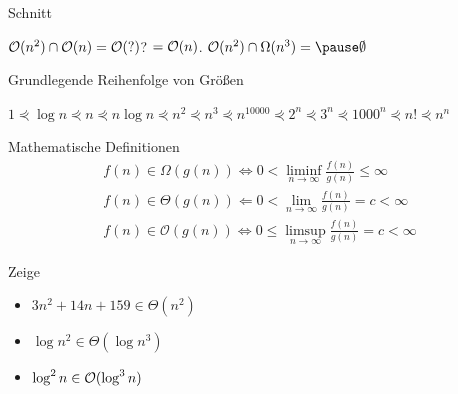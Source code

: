 \documentclass[]{beamer}
\begin{document}
\begin{frame}{Schnitt}
\begin{itemize}
\pitem $\mathcal{O} (n^2) \cap \mathcal{O}(n) = \mathcal{O}(?)$? \pause $= \mathcal{O}(n)$.
\pitem $\okalk(n^2) \cap \Omega(n^3) = \pause \emptyset$
\end{itemize}
\end{frame}

\begin{frame}{Grundlegende Reihenfolge von Größen}
\begin{center}
$1 \curlyeqprec \log n \curlyeqprec n \curlyeqprec n \log n \curlyeqprec n^2 \curlyeqprec n^3 \curlyeqprec n^{10000} \curlyeqprec 2^n \curlyeqprec 3^n \curlyeqprec 1000^n \curlyeqprec n! \curlyeqprec n^n$
\end{center}
\end{frame}

\begin{frame}{Mathematische Definitionen}
\begin{align*}
f(n) \in \Omega(g(n)) \Leftrightarrow 0 < \liminf_{n \rightarrow \infty} \frac{f(n)}{g(n)} \leq \infty\\
f(n) \in \Theta(g(n)) \Leftarrow  0 <  \lim_{n \rightarrow \infty} \frac{f(n)}{g(n)} = c < \infty\\
f(n) \in \mathcal{O}(g(n)) \Leftrightarrow 0 \leq \limsup_{n \rightarrow \infty} \frac{f(n)}{g(n)} = c < \infty
\end{align*}

\bp

\begin{taskblock}{Zeige}
\begin{itemize}
\item $3n^2 + 14n + 159 \in \Theta(n^2)$ %
\item $\log n^2 \in \Theta(\log n^3)$ %
\item $\log^2 n \in \mathcal{O}(\log^3 n)$ %
\end{itemize}
\end{taskblock}
\end{frame}


\end{document}
